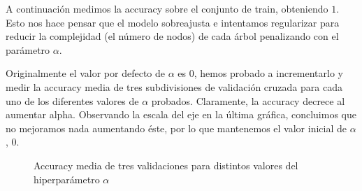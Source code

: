 \documentclass[a4]{article}
\begin{document}
A continuación medimos la accuracy sobre el conjunto de train,
obteniendo $1$. Esto nos hace pensar que el modelo sobreajusta e
intentamos regularizar para reducir la complejidad (el número de
nodos) de cada árbol penalizando con el parámetro $\alpha$.

Originalmente el valor por defecto de $\alpha$ es 0, hemos probado a
incrementarlo y medir la accuracy media de tres subdivisiones de
validación cruzada para cada uno de los diferentes valores de $\alpha$
probados. Claramente, la accuracy decrece al aumentar
alpha. Observando la escala del eje en la última gráfica, concluimos
que no mejoramos nada aumentando éste, por lo que mantenemos el valor
inicial de $\alpha$, $0$.

\begin{figure}[H]
  \centering
  \caption{Accuracy media de tres validaciones para distintos valores del hiperparámetro $\alpha$}
  \label{fig:HyperparametersRF}
\end{figure}
\end{document}
